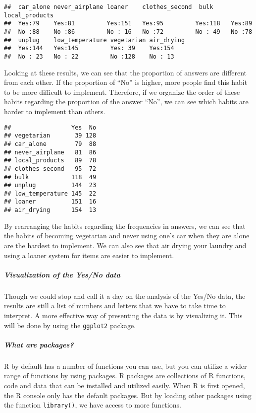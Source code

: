 \documentclass[
]{article}
\begin{document}
\begin{verbatim}
##  car_alone never_airplane loaner    clothes_second  bulk     local_products
##  Yes:79    Yes:81         Yes:151   Yes:95         Yes:118   Yes:89        
##  No :88    No :86         No : 16   No :72         No : 49   No :78        
##  unplug    low_temperature vegetarian air_drying
##  Yes:144   Yes:145         Yes: 39    Yes:154   
##  No : 23   No : 22         No :128    No : 13
\end{verbatim}

Looking at these results, we can see that the proportion of answers are
different from each other. If the proportion of ``No'' is higher, more
people find this habit to be more difficult to implement. Therefore, if
we organize the order of these habits regarding the proportion of the
answer ``No'', we can see which habits are harder to implement than
others.

\begin{verbatim}
##                 Yes  No
## vegetarian       39 128
## car_alone        79  88
## never_airplane   81  86
## local_products   89  78
## clothes_second   95  72
## bulk            118  49
## unplug          144  23
## low_temperature 145  22
## loaner          151  16
## air_drying      154  13
\end{verbatim}

By rearranging the habits regarding the frequencies in answers, we can
see that the habits of becoming vegetarian and never using one's car
when they are alone are the hardest to implement. We can also see that
air drying your laundry and using a loaner system for items are easier
to implement.

\hypertarget{visualization-of-the-yesno-data}{%
\subparagraph{Visualization of the Yes/No
data}\label{visualization-of-the-yesno-data}}

Though we could stop and call it a day on the analysis of the Yes/No
data, the results are still a list of numbers and letters that we have
to take time to interpret. A more effective way of presenting the data
is by visualizing it. This will be done by using the \texttt{ggplot2}
package.

\hypertarget{what-are-packages}{%
\subparagraph{What are packages?}\label{what-are-packages}}

R by default has a number of functions you can use, but you can utilize
a wider range of functions by using packages. R packages are collections
of R functions, code and data that can be installed and utilized easily.
When R is first opened, the R console only has the default packages. But
by loading other packages using the function \texttt{library()}, we have
access to more functions.
\end{document}

